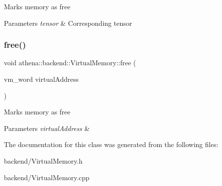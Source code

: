 Marks memory as free 
\begin{DoxyParams}{Parameters}
{\em tensor} & Corresponding tensor \\
\hline
\end{DoxyParams}
\mbox{\label{classathena_1_1backend_1_1_virtual_memory_ab24e17b8e8b2f8278b56b84dfdda42a3}} 
\subsubsection{\texorpdfstring{free()}{free()}\hspace{0.1cm}{\footnotesize\ttfamily [2/2]}}
{\footnotesize\ttfamily void athena\+::backend\+::\+Virtual\+Memory\+::free (\begin{DoxyParamCaption}\item[{vm\+\_\+word}]{virtual\+Address }\end{DoxyParamCaption})}

Marks memory as free 
\begin{DoxyParams}{Parameters}
{\em virtual\+Address} & \\
\hline
\end{DoxyParams}


The documentation for this class was generated from the following files\+:\begin{DoxyCompactItemize}
\item 
backend/Virtual\+Memory.\+h\item 
backend/Virtual\+Memory.\+cpp\end{DoxyCompactItemize}
